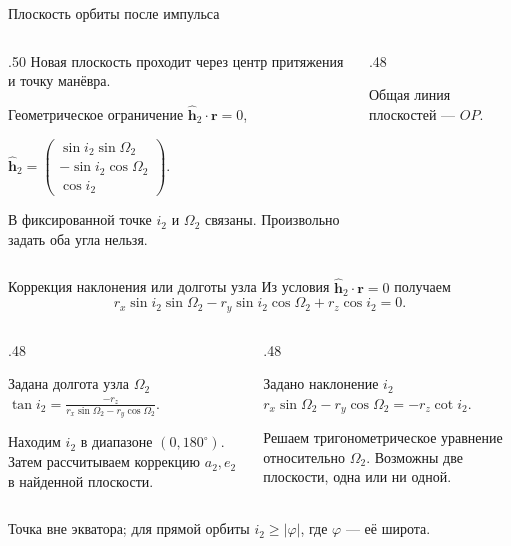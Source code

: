 \documentclass[11pt,aspectratio=169,t]{beamer}
\begin{document}
\begin{frame}{Плоскость орбиты после импульса}
\begin{columns}[T,onlytextwidth]
\begin{column}{.50\textwidth}
\justifying
Новая плоскость проходит через центр притяжения и точку манёвра.
\begin{block}{Геометрическое ограничение}
\centering
$\widehat{\mathbf h}_2\cdot\mathbf r=0$,\par\medskip
$\displaystyle\widehat{\mathbf h}_2=
\begin{pmatrix}
\sin i_2\sin\Omega_2\\
-\sin i_2\cos\Omega_2\\
\cos i_2
\end{pmatrix}$.
\end{block}
\justifying
В фиксированной точке $i_2$ и $\Omega_2$ связаны.
Произвольно задать оба угла нельзя.
\end{column}
\begin{column}{.48\textwidth}
\centering\par
{\color{coursemuted}
Общая линия плоскостей — $OP$.\par}
\end{column}
\end{columns}
\end{frame}

\begin{frame}{Коррекция наклонения или долготы узла}
Из условия $\widehat{\mathbf h}_2\cdot\mathbf r=0$ получаем
\[
r_x\sin i_2\sin\Omega_2-r_y\sin i_2\cos\Omega_2+r_z\cos i_2=0.
\]
\begin{columns}[T,onlytextwidth]
\begin{column}{.48\textwidth}
\begin{block}{Задана долгота узла $\Omega_2$}
\centering
$\displaystyle\tan i_2=\frac{-r_z}{r_x\sin\Omega_2-r_y\cos\Omega_2}$.
\end{block}
\raggedright
Находим $i_2$ в диапазоне $(0,180^\circ)$.
Затем рассчитываем коррекцию $a_2,e_2$ в найденной плоскости.
\end{column}
\begin{column}{.48\textwidth}
\begin{block}{Задано наклонение $i_2$}
\centering
$r_x\sin\Omega_2-r_y\cos\Omega_2=-r_z\cot i_2$.
\end{block}
\raggedright
Решаем тригонометрическое уравнение относительно $\Omega_2$.
Возможны две плоскости, одна или ни одной.
\end{column}
\end{columns}
\medskip
\raggedright
Точка вне экватора; для прямой орбиты $i_2\ge|\varphi|$, где $\varphi$ --- её широта.
\end{frame}
\end{document}
